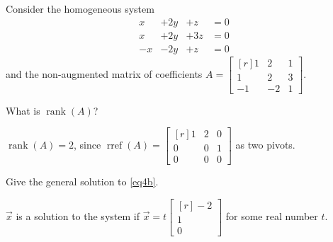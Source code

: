 \documentclass{problemset}
\DeclareMathOperator{\Rref}{rref}
\DeclareMathOperator{\Rank}{rank}
\newcommand{\rref}{\Rref}
\newcommand{\mat}[1]{\begin{bmatrix*}[r]#1\end{bmatrix*}}
\begin{document}
	\question
	Consider the homogeneous system 
		\begin{equation}\label{eq4b}
			\begin{array}{llll}
				x&+2y&+z &= 0\\
				x&+2y&+3z &= 0\\
				-x&-2y&+z &= 0
			\end{array}
		\end{equation}
	and the non-augmented matrix of coefficients $A=\mat{1&2&1\\1&2&3\\-1&-2&1}$.
	\begin{parts}
		\item What is $\Rank(A)$?
			\begin{solution}
				$\Rank(A)=2$, since $\rref(A)=\mat{1&2&0\\0&0&1\\0&0&0}$ as two pivots.
			\end{solution}
		\item Give the general solution to \eqref{eq4b}.
			\begin{solution}
				$\vec x$ is a solution to the system if 
				$\vec x=t\mat{-2\\1\\0}$ for some real number $t$.


\end{solution}
\end{parts}
\end{document}
